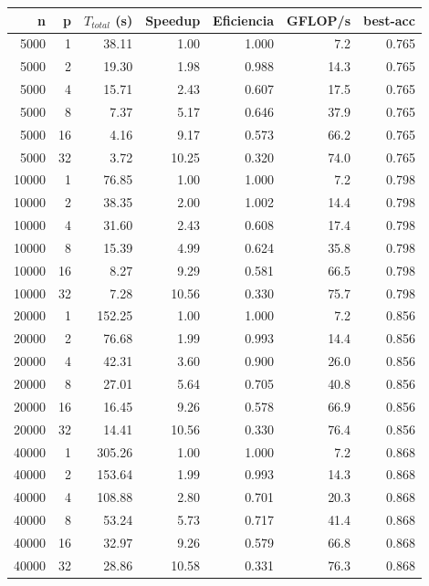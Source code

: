 \begin{tabular}{rrrrrrr}
\hline
n & p & $T_{total}$ (s) & Speedup & Eficiencia & GFLOP/s & best-acc \\
\hline
5000 & 1 & 38.11 & 1.00 & 1.000 & 7.2 & 0.765 \\
5000 & 2 & 19.30 & 1.98 & 0.988 & 14.3 & 0.765 \\
5000 & 4 & 15.71 & 2.43 & 0.607 & 17.5 & 0.765 \\
5000 & 8 & 7.37 & 5.17 & 0.646 & 37.9 & 0.765 \\
5000 & 16 & 4.16 & 9.17 & 0.573 & 66.2 & 0.765 \\
5000 & 32 & 3.72 & 10.25 & 0.320 & 74.0 & 0.765 \\
10000 & 1 & 76.85 & 1.00 & 1.000 & 7.2 & 0.798 \\
10000 & 2 & 38.35 & 2.00 & 1.002 & 14.4 & 0.798 \\
10000 & 4 & 31.60 & 2.43 & 0.608 & 17.4 & 0.798 \\
10000 & 8 & 15.39 & 4.99 & 0.624 & 35.8 & 0.798 \\
10000 & 16 & 8.27 & 9.29 & 0.581 & 66.5 & 0.798 \\
10000 & 32 & 7.28 & 10.56 & 0.330 & 75.7 & 0.798 \\
20000 & 1 & 152.25 & 1.00 & 1.000 & 7.2 & 0.856 \\
20000 & 2 & 76.68 & 1.99 & 0.993 & 14.4 & 0.856 \\
20000 & 4 & 42.31 & 3.60 & 0.900 & 26.0 & 0.856 \\
20000 & 8 & 27.01 & 5.64 & 0.705 & 40.8 & 0.856 \\
20000 & 16 & 16.45 & 9.26 & 0.578 & 66.9 & 0.856 \\
20000 & 32 & 14.41 & 10.56 & 0.330 & 76.4 & 0.856 \\
40000 & 1 & 305.26 & 1.00 & 1.000 & 7.2 & 0.868 \\
40000 & 2 & 153.64 & 1.99 & 0.993 & 14.3 & 0.868 \\
40000 & 4 & 108.88 & 2.80 & 0.701 & 20.3 & 0.868 \\
40000 & 8 & 53.24 & 5.73 & 0.717 & 41.4 & 0.868 \\
40000 & 16 & 32.97 & 9.26 & 0.579 & 66.8 & 0.868 \\
40000 & 32 & 28.86 & 10.58 & 0.331 & 76.3 & 0.868 \\
\hline
\end{tabular}
